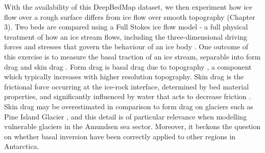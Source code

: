 With the availability of this DeepBedMap dataset, we then experiment how ice flow over a rough surface differs from ice flow over smooth topography (Chapter 3). %
Two beds are compared using a Full Stokes ice flow model - a full physical treatment of how an ice stream flows, including the three-dimensional driving forces and stresses that govern the behaviour of an ice body \citep{LarourContinentalscalehigh2012}.
One outcome of this exercise is to measure the basal traction of an ice stream, separable into form drag and skin drag \citep[Fig.~\ref{fig:1.3}][]{BinghamDiverselandscapesPine2017,Kyrke-SmithRelevanceDetailBasal2018,Minchewuniversalglacierslip2020,SchoofBasalperturbationsice2002}.
Form drag is basal drag due to topography \citep[c.f.][]{WeertmanSlidingGlaciers1957}, a component which typically increases with higher resolution topography.
Skin drag is the frictional force occurring at the ice-rock interface, determined by bed material properties, and significantly influenced by water that acts to decrease friction \citep{IversonExperimentsdynamicssedimentary2015}.
Skin drag may be overestimated in comparison to form drag on glaciers such as Pine Island Glacier \citep{BinghamDiverselandscapesPine2017,Kyrke-SmithRelevanceDetailBasal2018}, and this detail is of particular relevance when modelling vulnerable glaciers in the Amundsen sea sector.
Moreover, it beckons the question on whether basal inversion have been correctly applied to other regions in Antarctica.


